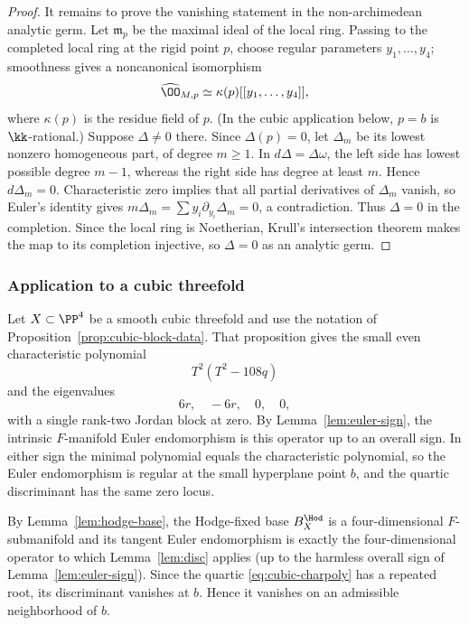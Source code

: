 \begin{proof}
It remains to prove the vanishing statement in the non-archimedean analytic
germ.  Let $\mathfrak m_p$ be the maximal ideal of the local ring.  Passing
to the completed local ring at the rigid point $p$, choose regular parameters
$y_1,\dots,y_4$; smoothness gives a noncanonical isomorphism
\[
  \widehat{\OO}_{M,p}\simeq \kappa(p)[[y_1,\dots,y_4]],
\]
where $\kappa(p)$ is the residue field of $p$.  (In the cubic application
below, $p=b$ is $\kk$-rational.)
Suppose $\Delta\ne0$ there.  Since $\Delta(p)=0$, let $\Delta_m$ be its
lowest nonzero homogeneous part, of degree $m\ge1$.  In
$d\Delta=\Delta\omega$, the left side has lowest possible degree $m-1$,
whereas the right side has degree at least $m$.  Hence $d\Delta_m=0$.
Characteristic zero implies that all partial derivatives of $\Delta_m$
vanish, so Euler's identity gives
$m\Delta_m=\sum y_i\partial_{y_i}\Delta_m=0$, a contradiction.  Thus
$\Delta=0$ in the completion.  Since the local ring is Noetherian, Krull's
intersection theorem makes the map to its completion injective, so
$\Delta=0$ as an analytic germ.
\end{proof}

\subsubsection{Application to a cubic threefold}

Let $X\subset\PP^4$ be a smooth cubic threefold and use the notation of
Proposition~\ref{prop:cubic-block-data}.  That proposition gives the small
even characteristic polynomial
\begin{equation}\label{eq:cubic-charpoly}
  T^2(T^2-108q)
\end{equation}
and the eigenvalues
\begin{equation}\label{eq:cubic-eigs}
  6r,\quad -6r,\quad 0,\quad0,
\end{equation}
with a single rank-two Jordan block at zero.
By Lemma~\ref{lem:euler-sign}, the intrinsic $F$-manifold Euler
endomorphism is this operator up to an overall sign.  In either sign the minimal polynomial
equals the characteristic polynomial, so the Euler endomorphism is regular
at the small hyperplane point $b$, and the quartic discriminant has the same
zero locus.

By Lemma~\ref{lem:hodge-base}, the Hodge-fixed base
$B_X^{\Hod}$ is a four-dimensional $F$-submanifold and its tangent Euler
endomorphism is exactly the four-dimensional operator to which
Lemma~\ref{lem:disc} applies (up to the harmless overall sign of
Lemma~\ref{lem:euler-sign}).  Since the quartic
\eqref{eq:cubic-charpoly} has a repeated root, its discriminant vanishes at
$b$.  Hence it vanishes on an admissible neighborhood of $b$.


